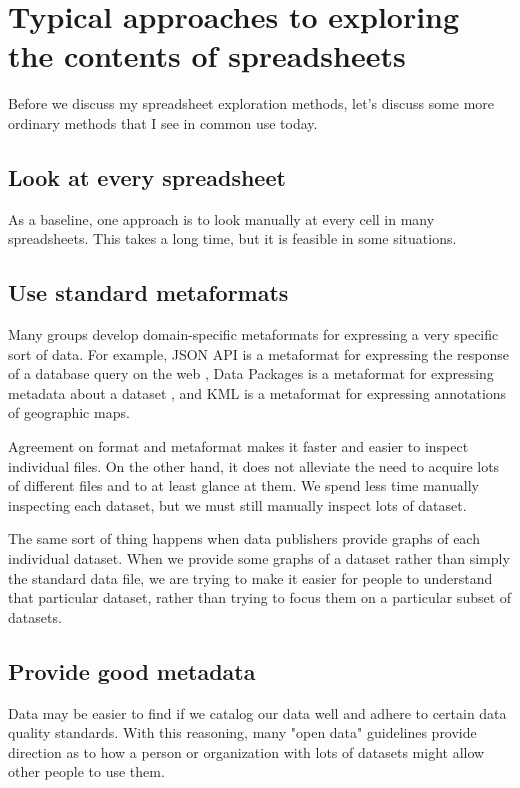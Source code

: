 \documentclass{acm_proc_article-sp}
\begin{document}
\section{Typical approaches to exploring the contents of spreadsheets}
Before we discuss my spreadsheet exploration methods, let's discuss some
more ordinary methods that I see in common use today.

\subsection{Look at every spreadsheet}
As a baseline,
one approach is to look manually at every cell in many spreadsheets.
This takes a long time, but it is feasible in some situations.

\subsection{Use standard metaformats}
Many groups develop domain-specific metaformats for expressing a very specific
sort of data. For example, JSON API is a metaformat for expressing the
response of a database query on the web \cite{jsonapi}, Data Packages is a
metaformat for expressing metadata about a dataset \cite{datapackages},
and KML is a metaformat for expressing annotations of geographic maps.\citep{kml}

Agreement on format and metaformat makes it faster and easier to inspect
individual files. On the other hand, it does not alleviate the
need to acquire lots of different files and to at least glance at them.
We spend less time manually inspecting each dataset, but we must still
manually inspect lots of dataset.

The same sort of thing happens when data publishers provide graphs of
each individual dataset. When we provide some graphs of a dataset
rather than simply the standard data file, we are trying to make it easier for
people to understand that particular dataset, rather than trying to focus
them on a particular subset of datasets.

\subsection{Provide good metadata} \label{guidelines}
Data may be easier to find if we catalog our data well and adhere to
certain data quality standards. With this reasoning,
many "open data" guidelines provide direction as to how a person
or organization with lots of datasets might allow other people
to use them.
\cite{open-data-census,fivestars,sunlight,sebastopol,odi}
\end{document}
